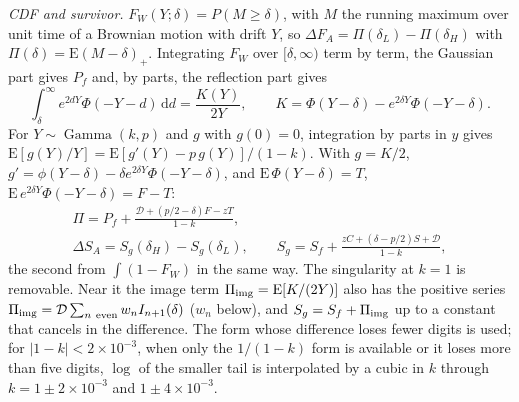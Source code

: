 \documentclass[12pt]{article}
\newcommand{\dd}{\,\mathrm{d}}
\newcommand{\PhiN}{\Phi}
\newcommand{\phiN}{\phi}
\begin{document}
\emph{CDF and survivor.} $F_W(Y;\delta)=P(M\ge\delta)$, with $M$ the running maximum over unit time of a Brownian motion with drift $Y$, so $\Delta F_A=\Pi(\delta_L)-\Pi(\delta_H)$ with $\Pi(\delta)=\mathrm E(M-\delta)_+$. Integrating $F_W$ over $[\delta,\infty)$ term by term, the Gaussian part gives $P_f$ and, by parts, the reflection part gives
\begin{equation}
  \int_\delta^\infty e^{2dY}\PhiN(-Y-d)\dd d=\frac{K(Y)}{2Y},\qquad
  K=\PhiN(Y-\delta)-e^{2\delta Y}\PhiN(-Y-\delta).
\end{equation}
For $Y\sim\operatorname{Gamma}(k,p)$ and $g$ with $g(0)=0$, integration by parts in $y$ gives $\mathrm E[g(Y)/Y]=\mathrm E[g'(Y)-p\,g(Y)]/(1-k)$. With $g=K/2$, $g'=\phiN(Y-\delta)-\delta e^{2\delta Y}\PhiN(-Y-\delta)$, and $\mathrm E\,\PhiN(Y-\delta)=T$, $\mathrm E\,e^{2\delta Y}\PhiN(-Y-\delta)=F-T$:
\begin{gather}
  \Pi=P_f+\frac{\mathcal D+(p/2-\delta)F-zT}{1-k},\\
  \Delta S_A=S_g(\delta_H)-S_g(\delta_L),\qquad
  S_g=S_f+\frac{zC+(\delta-p/2)S+\mathcal D}{1-k},
\end{gather}
the second from $\int(1-F_W)$ in the same way. The singularity at $k=1$ is removable. Near it the image term $\Pi_{\rm img}=\mathrm E[K/(2Y)]$ also has the positive series $\Pi_{\rm img}=\mathcal D\sum_{n\ \mathrm{even}}w_nI_{n+1}(\delta)$ ($w_n$ below), and $S_g=S_f+\Pi_{\rm img}$ up to a constant that cancels in the difference. The form whose difference loses fewer digits is used; for $|1-k|<2\times10^{-3}$, when only the $1/(1-k)$ form is available or it loses more than five digits, $\log$ of the smaller tail is interpolated by a cubic in $k$ through $k=1\pm2\times10^{-3}$ and $1\pm4\times10^{-3}$.
\end{document}
